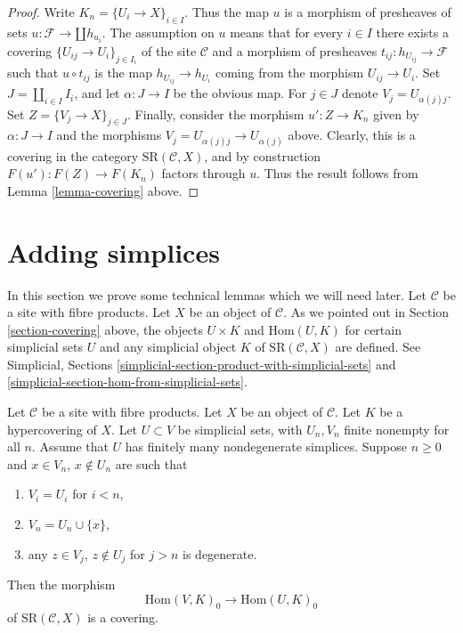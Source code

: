 \begin{proof}
Write $K_n = \{U_i \to X\}_{i \in I}$.
Thus the map $u$ is a morphism of presheaves of sets
$u : \mathcal{F} \to \amalg h_{u_i}$.
The assumption on $u$ means that for every
$i \in I$ there exists a covering $\{U_{ij} \to U_i\}_{j \in I_i}$
of the site $\mathcal{C}$ and a morphism of presheaves
$t_{ij} : h_{U_{ij}} \to \mathcal{F}$ such that
$u \circ t_{ij}$ is the map $h_{U_{ij}} \to h_{U_i}$
coming from the morphism $U_{ij} \to U_i$.
Set $J = \amalg_{i \in I} I_i$, and let
$\alpha : J \to I$ be the obvious map.
For $j \in J$ denote $V_j = U_{\alpha(j)j}$. Set
$Z = \{V_j \to X\}_{j \in J}$.
Finally, consider the morphism
$u' : Z \to K_n$ given by $\alpha : J \to I$
and the morphisms $V_j = U_{\alpha(j)j} \to U_{\alpha(j)}$
above. Clearly, this is a covering in the
category $\text{SR}(\mathcal{C}, X)$, and by
construction $F(u') : F(Z) \to F(K_n)$ factors through $u$.
Thus the result follows from Lemma \ref{lemma-covering} above.
\end{proof}


\section{Adding simplices}
\label{section-adding-simplices}

\noindent
In this section we prove some technical lemmas which we will need later.
Let $\mathcal{C}$ be a site with fibre products.
Let $X$ be an object of $\mathcal{C}$.
As we pointed out in Section \ref{section-covering} above,
the objects $U \times K$ and $\text{Hom}(U, K)$
for certain simplicial sets $U$
and any simplicial object $K$ of $\text{SR}(\mathcal{C}, X)$
are defined. See Simplicial, Sections
\ref{simplicial-section-product-with-simplicial-sets} and
\ref{simplicial-section-hom-from-simplicial-sets}.

\begin{lemma}
\label{lemma-one-more-simplex}
Let $\mathcal{C}$ be a site with fibre products.
Let $X$ be an object of $\mathcal{C}$.
Let $K$ be a hypercovering of $X$.
Let $U \subset V$ be simplicial sets, with $U_n, V_n$
finite nonempty for all $n$.
Assume that $U$ has finitely many nondegenerate simplices.
Suppose $n \geq 0$ and $x \in V_n$,
$x \not \in U_n$ are such that
\begin{enumerate}
\item $V_i = U_i$ for $i < n$,
\item $V_n = U_n \cup \{x\}$,
\item any $z \in V_j$, $z \not \in U_j$ for $j > n$
is degenerate.
\end{enumerate}
Then the morphism
$$
\text{Hom}(V, K)_0
\longrightarrow
\text{Hom}(U, K)_0
$$
of $\text{SR}(\mathcal{C}, X)$ is a covering.
\end{lemma}

